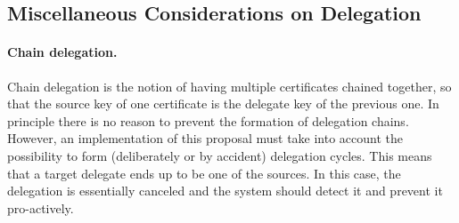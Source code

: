 \subsection*{Miscellaneous Considerations on Delegation}

\paragraph{Chain delegation.}
Chain delegation is the notion of having multiple certificates chained together, so that the source
key of one certificate is the delegate key of the previous one. In principle there is no reason to prevent the formation of delegation chains. However, an implementation of this proposal must take into account the possibility to form (deliberately or by accident) delegation cycles. This means that a target delegate ends up to be one of the sources. In this case, the delegation is essentially canceled and the system should detect it and prevent it pro-actively.


